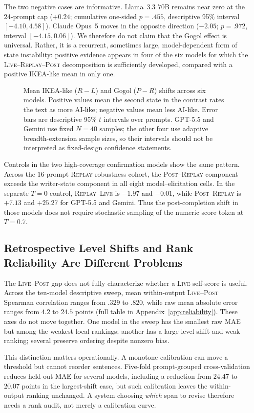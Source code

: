 \documentclass[10pt]{article}
\newcommand{\live}{\textsc{Live}}
\newcommand{\replay}{\textsc{Replay}}
\newcommand{\post}{\textsc{Post}}
\newcommand{\papersubsection}[1]{\Needspace{3.8\baselineskip}\subsection{#1}}
\begin{document}
The two negative cases are informative. Llama~3.3 70B remains near zero at the 24-prompt cap ($+0.24$; cumulative one-sided $p=.455$, descriptive 95\% interval $[-4.10,4.58]$). Claude Opus~5 moves in the opposite direction ($-2.05$; $p=.972$, interval $[-4.15,0.06]$). We therefore do not claim that the Gogol effect is universal. Rather, it is a recurrent, sometimes large, model-dependent form of state instability: positive evidence appears in four of the six models for which the \live{}--\replay{}--\post{} decomposition is sufficiently developed, compared with a positive IKEA-like mean in only one.

\begin{figure}[t]
\centering
\SixModelEffectsPlot
\caption{Mean IKEA-like ($R-L$) and Gogol ($P-R$) shifts across six models. Positive values mean the second state in the contrast rates the text as more AI-like; negative values mean less AI-like. Error bars are descriptive 95\% $t$ intervals over prompts. GPT-5.5 and Gemini use fixed $N=40$ samples; the other four use adaptive breadth-extension sample sizes, so their intervals should not be interpreted as fixed-design confidence statements.}
\label{fig:six-model-effects}
\end{figure}

Controls in the two high-coverage confirmation models show the same pattern. Across the 16-prompt \replay{} robustness cohort, the \post{}--\replay{} component exceeds the writer-state component in all eight model--elicitation cells. In the separate $T=0$ control, \replay{}--\live{} is $-1.97$ and $-0.01$, while \post{}--\replay{} is $+7.13$ and $+25.27$ for GPT-5.5 and Gemini. Thus the post-completion shift in those models does not require stochastic sampling of the numeric score token at $T=0.7$.

\papersubsection{Retrospective Level Shifts and Rank Reliability Are Different Problems}
The \live{}--\post{} gap does not fully characterize whether a \live{} self-score is useful. Across the ten-model descriptive sweep, mean within-output \live{}--\post{} Spearman correlation ranges from $.329$ to $.820$, while raw mean absolute error ranges from $4.2$ to $24.5$ points (full table in Appendix~\ref{app:reliability}). These axes do not move together. One model in the sweep has the smallest raw MAE but among the weakest local rankings; another has a large level shift and weak ranking; several preserve ordering despite nonzero bias.

This distinction matters operationally. A monotone calibration can move a threshold but cannot reorder sentences. Five-fold prompt-grouped cross-validation reduces held-out MAE for several models, including a reduction from $24.47$ to $20.07$ points in the largest-shift case, but such calibration leaves the within-output ranking unchanged. A system choosing \emph{which} span to revise therefore needs a rank audit, not merely a calibration curve.
\end{document}
